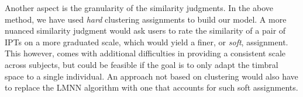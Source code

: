 \documentclass{bmcart}
\begin{document}
Another aspect is the granularity of the similarity judgments.
In the above method, we have used \emph{hard} clustering assignments to build our model.
A more nuanced similarity judgment would ask users to rate the similarity of a pair of IPTs on a more graduated scale, which would yield a finer, or \emph{soft}, assignment.
This however, comes with additional difficulties in providing a consistent scale across subjects, but could be feasible if the goal is to only adapt the timbral space to a single individual.
An approach not based on clustering would also have to replace the LMNN algorithm with one that accounts for such soft assignments.







\end{document}
